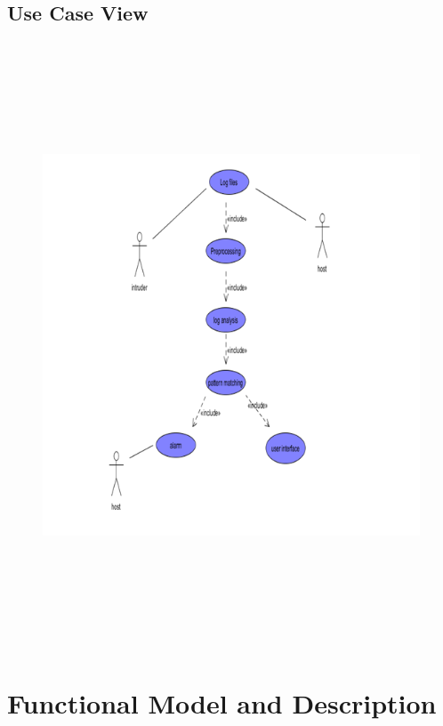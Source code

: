 \documentclass[12pt,a4paper]{report}
\begin{document}
\subsection{Use Case View}
\begin{figure}
  \includegraphics[width=\linewidth,height=18cm]{case.png}
  \label{fig:Use Case Diagram}
\end{figure}

\newpage
\section{Functional Model and Description}
\end{document}
